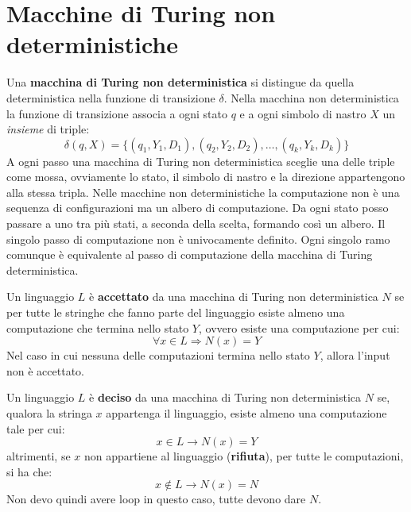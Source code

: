 \section{Macchine di Turing non deterministiche}
Una \textbf{macchina di Turing non deterministica} si distingue da quella
deterministica nella funzione di transizione $\delta$. Nella macchina non
deterministica la funzione di transizione associa a ogni stato $q$ e a ogni
simbolo di nastro $X$ un \textit{insieme} di triple:
\begin{equation}
    \delta(q, X) = \{(q_1, Y_1, D_1), (q_2, Y_2, D_2), \dots, (q_k, Y_k, D_k)\}
\end{equation}
A ogni passo una macchina di Turing non deterministica sceglie una delle triple
come mossa, ovviamente lo stato, il simbolo di nastro e la direzione appartengono
alla stessa tripla. Nelle macchine non deterministiche la computazione non è una
sequenza di configurazioni ma un albero di computazione. Da ogni stato posso
passare a uno tra più stati, a seconda della scelta, formando così un albero. Il
singolo passo di computazione non è univocamente definito. Ogni singolo ramo
comunque è equivalente al passo di computazione della macchina di Turing
deterministica.
\begin{definizione}
    Un linguaggio $L$ è \textbf{accettato} da una macchina di Turing non
    deterministica $N$ se per tutte le stringhe che fanno parte del linguaggio
    esiste almeno una computazione che termina nello stato $Y$, ovvero esiste
    una computazione per cui:
    \begin{equation}
        \forall x \in L \Rightarrow N(x) = Y
    \end{equation}
    Nel caso in cui nessuna delle computazioni termina nello stato $Y$, allora
    l'input non è accettato.
\end{definizione}
\begin{definizione}
    Un linguaggio $L$ è \textbf{deciso} da una macchina di Turing non
    deterministica $N$ se, qualora la stringa $x$ appartenga il linguaggio,
    esiste almeno una computazione tale per cui:
    \begin{equation}
        x \in L \to N(x) = Y
    \end{equation}
    altrimenti, se $x$ non appartiene al linguaggio (\textbf{rifiuta}), per
    tutte le computazioni, si ha che:
    \begin{equation}
        x \not\in L \to N(x) = N
    \end{equation}
    Non devo quindi avere loop in questo caso, tutte devono dare $N$.
\end{definizione}
